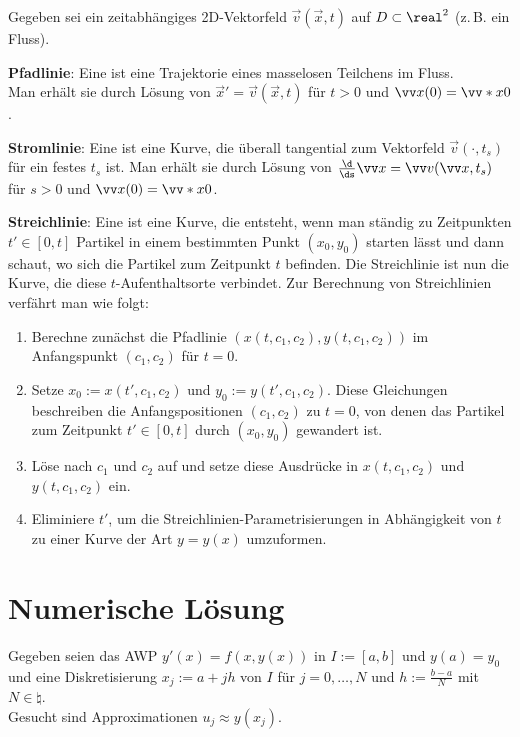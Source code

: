 Gegeben sei ein zeitabhängiges 2D-Vektorfeld $\vec{v}(\vec{x}, t)$ auf $D \subset \real^2$
(z.\,B. ein Fluss).

\textbf{Pfadlinie}:
Eine  ist eine Trajektorie eines masselosen Teilchens im Fluss.\\
Man erhält sie durch Lösung von $\vec{x}' = \vec{v}(\vec{x}, t)$ für $t > 0$ und
$\vec{x}(0) = \vecs{x}{0}$.

\textbf{Stromlinie}:
Eine  ist eine Kurve, die überall tangential zum
Vektorfeld $\vec{v}(\cdot, t_s)$ für ein festes $t_s$ ist.
Man erhält sie durch Lösung von $\frac{\d}{\ds}\vec{x} = \vec{v}(\vec{x}, t_s)$ für $s > 0$ und
$\vec{x}(0) = \vecs{x}{0}$.

\textbf{Streichlinie}:
Eine  ist eine Kurve, die entsteht, wenn man ständig zu Zeitpunkten
$t' \in [0, t]$ Partikel in einem bestimmten Punkt $(x_0, y_0)$ starten lässt
und dann schaut, wo sich die Partikel zum Zeitpunkt $t$ befinden.
Die Streichlinie ist nun die Kurve, die diese $t$-Aufenthaltsorte verbindet.
Zur Berechnung von Streichlinien verfährt man wie folgt:
\begin{enumerate}
    \item
    Berechne zunächst die Pfadlinie $(x(t, c_1, c_2), y(t, c_1, c_2))$
    im Anfangspunkt $(c_1, c_2)$ für $t = 0$.

    \item
    Setze $x_0 := x(t', c_1, c_2)$ und $y_0 := y(t', c_1, c_2)$.
    Diese Gleichungen beschreiben die Anfangspositionen $(c_1, c_2)$ zu $t = 0$,
    von denen das Partikel zum Zeitpunkt $t' \in [0, t]$ durch $(x_0, y_0)$ gewandert ist.

    \item
    Löse nach $c_1$ und $c_2$ auf und setze diese Ausdrücke in $x(t, c_1, c_2)$ und
    $y(t, c_1, c_2)$ ein.

    \item
    Eliminiere $t'$, um die Streichlinien-Parametrisierungen in Abhängigkeit von $t$
    zu einer Kurve der Art $y = y(x)$ umzuformen.
\end{enumerate}

\section{%
    Numerische Lösung%
}

Gegeben seien das AWP $y'(x) = f(x, y(x))$ in $I := [a, b]$ und $y(a) = y_0$
und eine Diskretisierung $x_j := a + jh$ von $I$ für $j = 0, \dotsc, N$ und $h := \frac{b-a}{N}$
mit $N \in \natural$.\\
Gesucht sind Approximationen $u_j \approx y(x_j)$.

